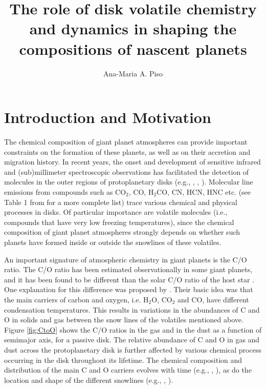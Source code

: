 \documentclass[manuscript]{aastex}
\begin{document}


\title{The role of disk volatile chemistry and dynamics in shaping the compositions of nascent planets}
\author{Ana-Maria A. Piso}

\section{Introduction and Motivation}



The chemical composition of giant planet atmospheres can provide important constraints on the formation of these planets, as well as on their accretion and migration history. In recent years, the onset and development of sensitive infrared and (sub)millimeter spectroscopic observations has facilitated the detection of molecules in the outer regions of protoplanetary disks (e.g., \citealt{oberg10}, \citealt{oberg11c}, \citealt{oberg11b}). Molecular line emissions from compounds such as CO$_2$, CO, H$_2$CO, CN, HCN, HNC etc. (see Table 1 from \citealt{henning13} for a more complete list) trace various chemical and physical processes in disks. Of particular importance are volatile molecules (i.e., compounds that have very low freezing temperatures), since the chemical composition of giant planet atmospheres strongly depends on whether such planets have formed inside or outside the snowlines of these volatiles.  

An important signature of atmospheric chemistry in giant planets is the C/O ratio. The C/O ratio has been estimated observationally in some giant planets, and it has been found to be different than the solar C/O ratio of the host star \citep{madhu11}. One explanation for this difference was proposed by \citet{oberg11}. Their basic idea was that the main carriers of carbon and oxygen, i.e. H$_2$O, CO$_2$ and CO, have different condensation temperatures. This results in variations in the abundances of C and O in solids and gas between the snow lines of the volatiles mentioned above. Figure \ref{fig:CtoO} shows the C/O ratios in the gas and in the dust as a function of semimajor axis, for a passive disk. The relative abundance of C and O in gas and dust across the protoplanetary disk is further affected by various chemical process occurring in the disk throughout its lifetime. The chemical composition and distribution of the main C and O carriers evolves with time (e.g., \citealt{ciesla06}, \citealt{visser09}), as do the location and shape of the different snowlines (e.g., \citealt{garaud07}, \citealt{stevenson88}). %
\end{document}
